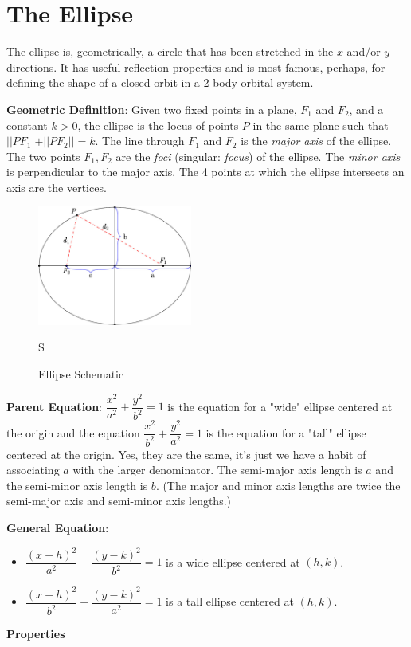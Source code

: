 \documentclass[11pt]{article}
\author{}
\date{}
\let\oldsection\section
\renewcommand{\section}[1]{\clearpage\oldsection{#1}}
\begin{document}
\hypertarget{the-ellipse}{%
\section{The Ellipse}\label{the-ellipse}}

The ellipse is, geometrically, a circle that has been stretched in the
\(x\) and/or \(y\) directions. It has useful reflection properties and
is most famous, perhaps, for defining the shape of a closed orbit in a
2-body orbital system.

\textbf{Geometric Definition}: Given two fixed points in a plane,
\(F_1\) and \(F_2\), and a constant \(k > 0\), the ellipse is the locus
of points \(P\) in the same plane such that \(||PF_1| + ||PF_2|| = k\).
The line through \(F_1\) and \(F_2\) is the \emph{major axis} of the
ellipse. The two points \(F_1,F_2\) are the \emph{foci} (singular:
\emph{focus}) of the ellipse. The \emph{minor axis} is perpendicular to
the major axis. The 4 points at which the ellipse intersects an axis are
the vertices.

\begin{figure}
\centering
\includegraphics[width=2in,height=\textheight]{workspace.jpeg}
\caption{Ellipse Schematic}S
\end{figure}

\textbf{Parent Equation}: \(\dfrac{x^2}{a^2}+\dfrac{y^2}{b^2}=1\) is the
equation for a "wide" ellipse centered at the origin and the equation 
\(\dfrac{x^2}{b^2}+\dfrac{y^2}{a^2}=1\) is the
equation for a "tall" ellipse centered at the origin. Yes, they are the same,
it's just we have a habit of associating $a$ with the larger denominator.
The semi-major axis
length is $a$ and the semi-minor axis length is $b$.
(The major and minor axis lengths are twice the semi-major axis and
semi-minor axis lengths.)

\textbf{General Equation}:
\begin{itemize}
  \item \(\dfrac{(x-h)^2}{a^2} + \dfrac{(y-k)^2}{b^2} = 1\) is a wide ellipse
centered at \((h,k)\).
  \item \(\dfrac{(x-h)^2}{b^2} + \dfrac{(y-k)^2}{a^2} = 1\) is a tall ellipse
  centered at \((h,k)\).
\end{itemize}
\textbf{Properties}
\end{document}

